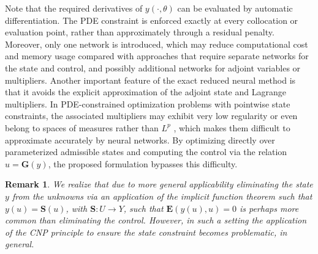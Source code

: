 \documentclass{article}
\numberwithin{equation}{section}
\newtheorem{remark}{Remark}[section]
\begin{document}
Note that the required derivatives of $y(\cdot,\theta)$ can be evaluated by automatic differentiation. The PDE constraint is enforced exactly at every collocation or evaluation point, rather than approximately through a residual penalty. Moreover, only one network is introduced, which may reduce computational cost and memory usage compared with approaches that require separate networks for the state and control, and possibly additional networks for adjoint variables or multipliers. Another important feature of the exact reduced neural method is that it avoids the explicit approximation of the adjoint state and Lagrange multipliers. In PDE-constrained optimization problems with pointwise state constraints, the associated multipliers may exhibit very low regularity or even belong to spaces of measures rather than $L^p$  \cite{hintermuller2006feasible,troltzsch2010optimal}, which makes them difficult to approximate accurately by neural networks. By optimizing directly over parameterized admissible states and computing the control via the relation $u=\mathbf{G}(y)$, the proposed formulation bypasses this difficulty. 

\begin{remark} We realize that due to more general applicability eliminating the state $y$ from the unknowns via an application of the implicit function theorem such that $y(u)=\mathbf{S}(u)$, with $\mathbf{S}:U\to Y$, such that $\mathbf{E}(y(u),u)=0$ is perhaps more common than eliminating the control. However, in such a setting the application of the CNP principle to ensure the state constraint becomes problematic, in general.
\end{remark}
\end{document}
